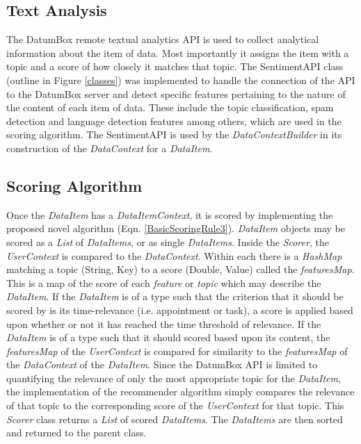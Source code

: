 \subsection{Text Analysis}

The DatumBox \cite{DatumBox} remote textual analytics API is used to collect analytical information about the item of data. Most importantly it assigns the item with a topic and a score of how closely it matches that topic. The SentimentAPI class (outline in Figure \ref{classes}) was implemented to handle the connection of the API to the DatumBox server and detect specific features pertaining to the nature of the content of each item of data. These include the topic classification, spam detection and language detection features among others, which are used in the scoring algorithm. 
The SentimentAPI is used by the \emph{DataContextBuilder} in its construction of the \emph{DataContext} for a \emph{DataItem}. 

\subsection{Scoring Algorithm}

Once the \emph{DataItem} has a \emph{DataItemContext}, it is scored by implementing the proposed novel algorithm (Eqn. \ref{BasicScoringRule3}). \emph{DataItem} objects may be scored as a \emph{List} of \emph{DataItems}, or as single \emph{DataItems}. 
Inside the \emph{Scorer}, the \emph{UserContext} is compared to the \emph{DataContext}. Within each there is a \emph{HashMap} matching a topic (String, Key) to a score (Double, Value) called the \emph{featuresMap}. This is a map of the score of each \emph{feature} or \emph{topic} which may describe the \emph{DataItem}.
If the \emph{DataItem} is of a type such that the criterion that it should be scored by is its time-relevance (i.e. appointment or task), a score is applied based upon whether or not it has reached the time threshold of relevance. If the \emph{DataItem} is of a type such that it should scored based upon its content, the \emph{featuresMap} of the \emph{UserContext} is compared for similarity to the \emph{featuresMap} of the \emph{DataContext} of the \emph{DataItem}.
Since the DatumBox API is limited to quantifying the relevance of only the most appropriate topic for the \emph{DataItem}, the implementation of the recommender algorithm simply compares the relevance of that topic to the corresponding score of the \emph{UserContext} for that topic. 
This \emph{Scorer} class returns a \emph{List} of scored \emph{DataItems}. The \emph{DataItems} are then sorted and returned to the parent class.

